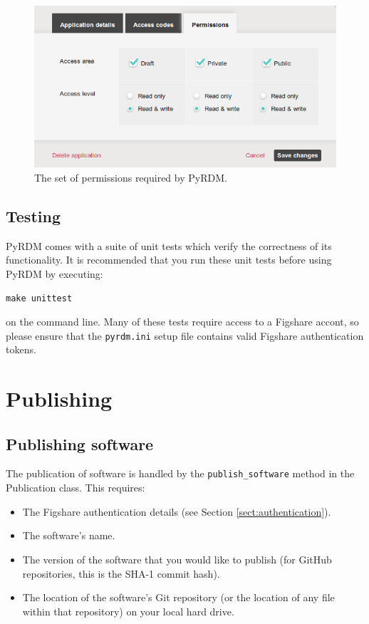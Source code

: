 \documentclass[a4paper,11pt]{report}
\begin{document}
\begin{figure}
  \centering
  \includegraphics[width=1\columnwidth]{images/permissions.png}
  \caption{The set of permissions required by PyRDM.}
  \label{fig:permissions}
\end{figure}

\section{Testing}
PyRDM comes with a suite of unit tests which verify the correctness of its functionality. It is recommended that you run these unit tests before using PyRDM by executing:

  \texttt{make unittest}
  
on the command line. Many of these tests require access to a Figshare accont, so please ensure that the \texttt{pyrdm.ini} setup file contains valid Figshare authentication tokens.

\chapter{Publishing}

\section{Publishing software}
The publication of software is handled by the \texttt{publish\_software} method in the Publication class. This requires:

\begin{itemize}
  \item The Figshare authentication details (see Section \ref{sect:authentication}).
  \item The software's name.
  \item The version of the software that you would like to publish (for GitHub repositories, this is the SHA-1 commit hash).
  \item The location of the software's Git repository (or the location of any file within that repository) on your local hard drive.
\end{itemize}
\end{document}
